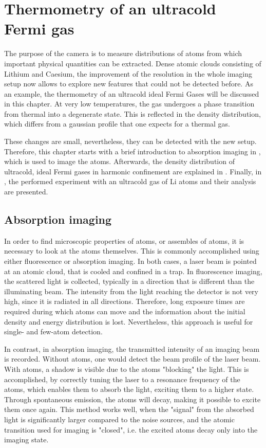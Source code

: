 \chapter{Thermometry of an ultracold Fermi gas}
\label{ch:idealfermigas}
The purpose of the camera is to measure distributions of atoms from which important physical quantities can be extracted. Dense atomic clouds consisting of Lithium and Caesium, the improvement of the resolution in the whole imaging setup now allows to explore new features that could not be detected before. As an example, the thermometry of an ultracold ideal Fermi Gases will be discussed in this chapter. At very low temperatures, the gas undergoes a phase transition from thermal into a degenerate state. This is reflected in the density distribution, which differs from a gaussian profile that one expects for a thermal gas.

These changes are small, nevertheless, they can be detected with the new setup. Therefore, this chapter starts with a brief introduction to absorption imaging in , which is used to image the atoms. Afterwards, the density distribution of ultracold, ideal Fermi gases in harmonic confinement are explained in .
Finally, in , the performed experiment with an ultracold gas of Li atoms and their analysis are presented.

\section{Absorption imaging}
\label{sec:absim}
In order to find microscopic properties of atoms, or assembles of atoms, it is necessary to look at the atoms themselves. This is commonly accomplished using either fluorescence or absorption imaging\cite{Ketterle1999}. In both cases, a laser beam is pointed at an atomic cloud, that is cooled and confined in a trap. In fluorescence imaging, the scattered light is collected, typically in a direction that is different than the illuminating beam.
The intensity from the light reaching the detector is not very high, since it is radiated in all directions. Therefore, long exposure times are required during which atoms can move and the information about the initial density and energy distribution is lost. Nevertheless, this approach is useful for single- and few-atom detection.

In contrast, in absorption imaging\cite{Ketterle1999}, the transmitted intensity of an imaging beam is recorded. Without atoms, one would detect the beam profile of the laser beam. With atoms, a shadow is visible due to the atoms "blocking" the light. This is accomplished, by correctly tuning the laser to a resonance frequency of the atoms, which enables them to absorb the light, exciting them to a higher state. Through spontaneous emission, the atoms will decay, making it possible to excite them once again. This method works well, when the "signal" from the absorbed light is significantly larger compared to the noise sources, and the atomic transition used for imaging is "closed", i.e. the excited atoms decay only into the imaging state.

